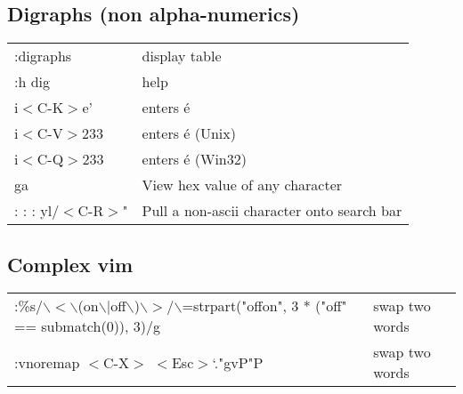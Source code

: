 \subsection{Digraphs (non alpha-numerics)}
\begin{center}
\begin{longtable}{l|l}
:digraphs                         & display table\\
:h dig                            & help\\
i$<$C-K$>$e'                      & enters é\\
i$<$C-V$>$233                     & enters é (Unix)\\
i$<$C-Q$>$233                     & enters é (Win32)\\
ga                                & View hex value of any character\\
:%
:%
:%
yl/$<$C-R$>$" &  Pull a non-ascii character onto search bar
\end{longtable}
\end{center}

\subsection{Complex vim}
\begin{center}
\begin{longtable}{l|l}
:\%s/$\backslash$$<$$\backslash$(on$\backslash$$|$off$\backslash$)$\backslash$$>$/$\backslash$=strpart("offon", 3 * ("off" == submatch(0)), 3)/g & swap two words\\
:vnoremap $<$C-X$>$ $<$Esc$>$`."gvP"P & swap two words
\end{longtable}
\end{center}


